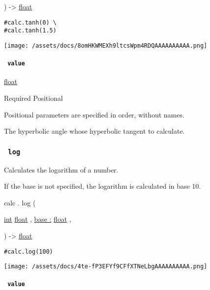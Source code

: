 ) -\textgreater{} \href{/docs/reference/foundations/float/}{float}

\begin{verbatim}
#calc.tanh(0) \
#calc.tanh(1.5)
\end{verbatim}

\texttt{[image: /assets/docs/8omHKWMEXh9ltcsWpm4RDQAAAAAAAAAA.png]}

\paragraph{\texorpdfstring{\texttt{\ value\ }}{ value }}\label{functions-tanh-value}

\href{/docs/reference/foundations/float/}{float}

{Required} {{ Positional }}

\label{functions-tanh-value-positional-tooltip}
Positional parameters are specified in order, without names.

The hyperbolic angle whose hyperbolic tangent to calculate.

\subsubsection{\texorpdfstring{\texttt{\ log\ }}{ log }}\label{functions-log}

Calculates the logarithm of a number.

If the base is not specified, the logarithm is calculated in base 10.

calc { . } { log } (

{ \href{/docs/reference/foundations/int/}{int}
\href{/docs/reference/foundations/float/}{float} , } {
\hyperref[functions-log-parameters-base]{base :}
\href{/docs/reference/foundations/float/}{float} , }

) -\textgreater{} \href{/docs/reference/foundations/float/}{float}

\begin{verbatim}
#calc.log(100)
\end{verbatim}

\texttt{[image: /assets/docs/4te-fP3EFYf9CFfXTNeLbgAAAAAAAAAA.png]}

\paragraph{\texorpdfstring{\texttt{\ value\ }}{ value }}\label{functions-log-value}

